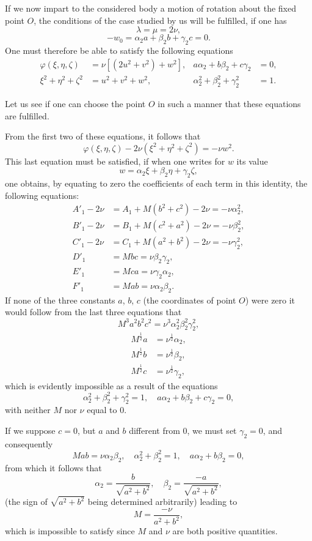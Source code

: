 \documentclass{article}
\begin{document}
If we now impart to the considered body a motion of rotation about the fixed point $O$, the conditions of the case studied by us will be fulfilled, if one has
\[
\lambda = \mu = 2\nu,
\]
\[
-w_0 = \alpha_2 a + \beta_2 b + \gamma_2 c = 0.
\]
One must therefore be able to satisfy the following equations
\begin{align*}
\varphi(\xi, \eta, \zeta) &= \nu\left[\left(2u^2+v^2\right)+w^2\right], & a \alpha_2  +  b \beta_2 +  c \gamma_2 &= 0, \\
\xi^2 + \eta^2 + \zeta^2 &= u^2 + v^2 + w^2, & \alpha_2^2 + \beta_2^2 + \gamma_2^2 &= 1.
\end{align*}

Let us see if one can choose the point $O$ in such a manner that these equations are fulfilled.

From the first two of these equations, it follows that
\[
\varphi(\xi, \eta, \zeta) - 2\nu(\xi^2 + \eta^2 + \zeta^2) = -\nu w^2.
\]
This last equation must be satisfied, if when one writes for $w$ its value
\[
w = \alpha_2\xi + \beta_2\eta + \gamma_2\zeta,
\]
one obtains, by equating to zero the coefficients of each term in this identity, the following equations:
\begin{align*}
A'_1 - 2\nu &= A_1 + M(b^2 + c^2) - 2\nu = -\nu\alpha_2^2, \\
B'_1 - 2\nu &= B_1 + M(c^2 + a^2) - 2\nu = -\nu\beta_2^2, \\
C'_1 - 2\nu &= C_1 + M(a^2 + b^2) - 2\nu = -\nu\gamma_2^2, \\
D'_1 &= Mbc = \nu\beta_2\gamma_2, \\
E'_1 &= Mca = \nu\gamma_2\alpha_2, \\
F'_1 &= Mab = \nu\alpha_2\beta_2.
\end{align*}
If none of the three constants $a$, $b$, $c$ (the coordinates of point $O$) were zero it would follow from the last three equations that
\[
M^3a^2b^2c^2 = \nu^3\alpha_2^2\beta_2^2\gamma_2^2,
\]
\begin{align*}
M^{\frac{1}{2}}a &= \nu^{\frac{1}{2}}\alpha_2, \\
M^{\frac{1}{2}}b &= \nu^{\frac{1}{2}}\beta_2, \\
M^{\frac{1}{2}}c &= \nu^{\frac{1}{2}}\gamma_2,
\end{align*}
which is evidently impossible as a result of the equations
\[
\alpha_2^2 + \beta_2^2 + \gamma_2^2 = 1, \quad a \alpha_2  + b \beta_2  + c \gamma_2  = 0,
\]
with neither $M$ nor $\nu$ equal to 0.

If we suppose $c = 0$, but $a$ and $b$ different from 0, we must set $\gamma_2 = 0$, and consequently
\[
Mab = \nu\alpha_2\beta_2, \quad \alpha_2^2 + \beta_2^2 = 1, \quad a \alpha_2 + b \beta_2 = 0,
\]
from which it follows that
\[
\alpha_2 = \frac{b}{\sqrt{a^2 + b^2}}, \quad \beta_2 = \frac{-a}{\sqrt{a^2 + b^2}},
\]
(the sign of $\sqrt{a^2 + b^2}$ being determined arbitrarily) leading to
\[
M = \frac{-\nu}{a^2 + b^2},
\]
which is impossible to satisfy since $M$ and $\nu$ are both positive quantities.
\end{document}
